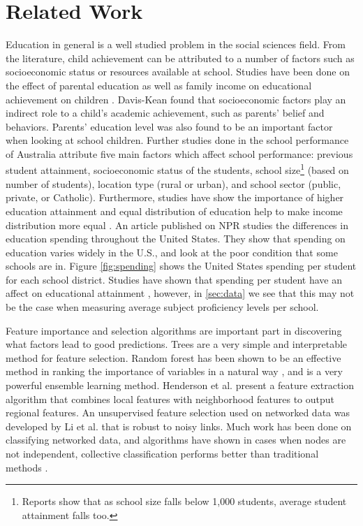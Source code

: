 \section{Related Work} \label{sec:relwork}

Education in general is a well studied problem in the social sciences field. From the literature, child achievement can be attributed to a number of factors such as socioeconomic status or resources available at school. Studies have been done on the effect of parental education as well as family income on educational achievement on children \cite{parentinfluence2005}. Davis-Kean found that socioeconomic factors play an indirect role to a child's academic achievement, such as parents' belief and behaviors. Parents' education level was also found to be an important factor when looking at school children. Further studies done in the school performance of Australia \cite{australiaschool2004} attribute five main factors which affect school performance: previous student attainment, socioeconomic status of the students, school size\footnote{Reports show that as school size falls below 1,000 students, average student attainment falls too.} (based on number of students), location type (rural or urban), and school sector (public, private, or Catholic). Furthermore, studies have show the importance of higher education attainment and equal distribution of education help to make income distribution more equal \cite{income2002greg, income2015breen}. An article published on NPR \cite{npr2016} studies the differences in education spending throughout the United States. They show that spending on education varies widely in the U.S., and look at the poor condition that some schools are in. Figure \ref{fig:spending} shows the United States spending per student for each school district. Studies have shown that spending per student have an affect on educational attainment \cite{spending2015, spending2017}, however, in \ref{sec:data} we see that this may not be the case when measuring average subject proficiency levels per school.

Feature importance and selection algorithms are important part in discovering what factors lead to good predictions. Trees are a very simple and interpretable method for feature selection. Random forest has been shown to be an effective method in ranking the importance of variables in a natural way \cite{breiman2001random}, and is a very powerful ensemble learning method. Henderson et al. \cite{recursive2011} present a feature extraction algorithm that combines local features with neighborhood features to output regional features. An unsupervised feature selection used on networked data was developed by Li et al. \cite{robustfeature2016} that is robust to noisy links. Much work has been done on classifying networked data, and algorithms have shown in cases when nodes are not independent, collective classification performs better than traditional methods \cite{collective2008}. 


